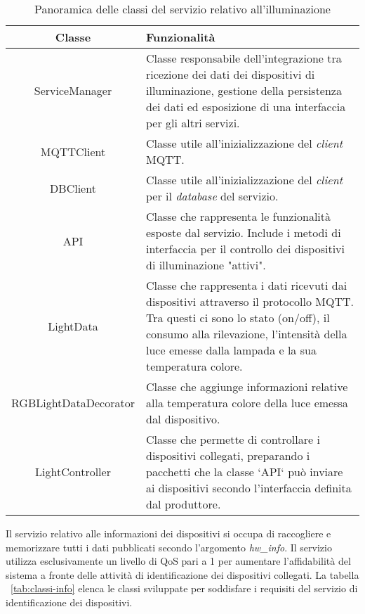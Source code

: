 \begin{table}[!h]
\caption{Panoramica delle classi del servizio relativo all'illuminazione}
\label{tab:classi-illuminazione}
\begin{tabularx}{\linewidth}{|c|X|}
\hline
\textbf{Classe} & \textbf{Funzionalità} \\
\hline
ServiceManager & Classe responsabile dell'integrazione tra ricezione dei dati dei dispositivi di illuminazione, gestione della persistenza dei dati ed esposizione di una interfaccia per gli altri servizi. \\
\hline
MQTTClient & Classe utile all'inizializzazione del \emph{client} MQTT. \\
\hline
DBClient & Classe utile all'inizializzazione del \emph{client} per il \emph{database} del servizio. \\
\hline
API & Classe che rappresenta le funzionalità esposte dal servizio. Include i metodi di interfaccia per il controllo dei dispositivi di illuminazione "attivi". \\
\hline
LightData & Classe che rappresenta i dati ricevuti dai dispositivi attraverso il protocollo MQTT. Tra questi ci sono lo stato (on/off), il consumo alla rilevazione, l'intensità della luce emesse dalla lampada e la sua temperatura colore. \\
\hline
RGBLightDataDecorator & Classe che aggiunge informazioni relative alla temperatura colore della luce emessa dal dispositivo. \\
\hline
LightController & Classe che permette di controllare i dispositivi collegati, preparando i pacchetti che la classe `API` può inviare ai dispositivi secondo l'interfaccia definita dal produttore. \\
\hline
\end{tabularx}
\end{table}

Il servizio relativo alle informazioni dei dispositivi si occupa di raccogliere e memorizzare tutti i dati pubblicati secondo l'argomento \emph{hw\_info}.
Il servizio utilizza esclusivamente un livello di QoS pari a 1 per aumentare l'affidabilità del sistema a fronte delle attività di identificazione dei dispositivi collegati.
La tabella ~\ref{tab:classi-info} elenca le classi sviluppate per soddisfare i requisiti del servizio di identificazione dei dispositivi.

